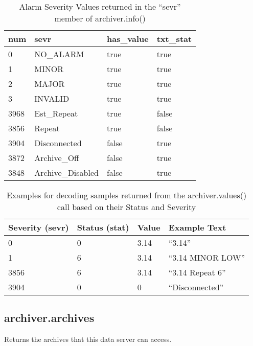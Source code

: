 \begin{table}[htbp]
  \begin{center}
    \sffamily
    \begin{tabular}[t]{l|l|l|l}
     num & sevr             & has\_value & txt\_stat \\
    \hline
       0 & NO\_ALARM        & true       & true  \\
       1 & MINOR            & true       & true  \\
       2 & MAJOR            & true       & true  \\
       3 & INVALID          & true       & true  \\
    3968 & Est\_Repeat      & true       & false \\
    3856 & Repeat           & true       & false \\
    3904 & Disconnected     & false      & true  \\
    3872 & Archive\_Off     & false      & true  \\
    3848 & Archive\_Disabled& false      & true
    \end{tabular}
    \caption{Alarm Severity Values returned in the ``sevr'' member of archiver.info()}
    \label{tab:sevr}
  \end{center}
\end{table}

\begin{table}[htbp]
  \begin{center}
    \sffamily
    \begin{tabular}[t]{l|l|l|l}
    Severity (sevr) & Status (stat) & Value & Example Text \\
    \hline
                  0 &            0  &  3.14 & ``3.14'' \\
                  1 &            6  &  3.14 & ``3.14 MINOR LOW'' \\
               3856 &            6  &  3.14 & ``3.14 Repeat 6'' \\
               3904 &            0  &  0    & ``Disconnected'' \\
    \end{tabular}
    \caption{Examples for decoding samples returned from the
    archiver.values() call based on their Status and Severity}
    \label{tab:statsevrexample}
  \end{center}
\end{table}

\subsection{archiver.archives} %
Returns the archives that this data server can access.

